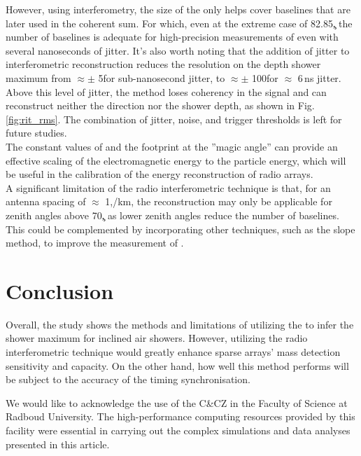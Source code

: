 However, using interferometry, the size of the \rc only helps cover baselines that are later used in the coherent sum. For which, even at the extreme case of  82.85\c, the number of baselines is adequate for high-precision measurements of \xmax even with several nanoseconds of jitter. It's also worth noting that the addition of jitter to interferometric reconstruction reduces the resolution on the depth shower maximum from $\approx \pm$ 5\gr for sub-nanosecond jitter, to  $\approx \pm$ 100\gr for $\approx $ 6\,ns jitter. Above this level of jitter, the method loses coherency in the signal and can reconstruct neither the direction nor the shower depth, as shown in Fig.\ref{fig:rit_rms}. The combination of jitter, noise, and trigger thresholds is left for future studies.\\

The constant values of \rc and the footprint at the ''magic angle'' can provide an effective scaling of the electromagnetic energy to the particle energy, which will be useful in the calibration of the energy reconstruction of radio arrays.\\
A significant limitation of the radio interferometric technique is that, for an antenna spacing of $\approx$ 1,/km, the reconstruction may only be applicable for zenith angles above 70\c, as lower zenith angles reduce the number of baselines. This could be complemented by incorporating other techniques, such as the slope method, to improve the measurement of \xmax.

\section{Conclusion}\label{sec:conc}
Overall, the study shows the methods and limitations of utilizing the \rc to infer the shower maximum for inclined air showers. However, utilizing the radio interferometric technique would greatly enhance sparse arrays' mass detection sensitivity and capacity. On the other hand, how well this method performs will be subject to the accuracy of the timing synchronisation.

\begin{acknowledgements}
We would like to acknowledge the use of the C\&CZ in the Faculty of Science at  Radboud University. The high-performance computing resources provided by this facility were essential in carrying out the complex simulations and data analyses presented in this article. 
\end{acknowledgements}
 




